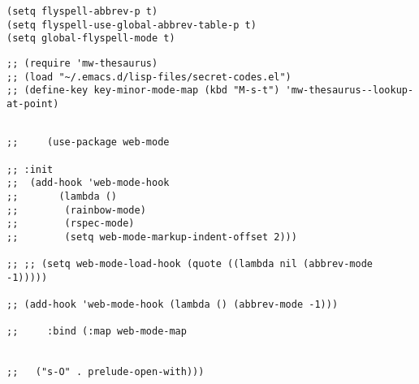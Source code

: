 \documentclass[11pt]{article}
\begin{document}
\label{sec:orgbe33d24}
\begin{verbatim}
(setq flyspell-abbrev-p t)
(setq flyspell-use-global-abbrev-table-p t)
(setq global-flyspell-mode t)
\end{verbatim}

\label{sec:org73724bb}
\begin{verbatim}
;; (require 'mw-thesaurus)
;; (load "~/.emacs.d/lisp-files/secret-codes.el")
;; (define-key key-minor-mode-map (kbd "M-s-t") 'mw-thesaurus--lookup-at-point)
\end{verbatim}

\label{sec:orgd09a244}
\begin{verbatim}

;;     (use-package web-mode

;; :init
;;  (add-hook 'web-mode-hook
;;       (lambda ()
;;        (rainbow-mode)
;;        (rspec-mode)
;;        (setq web-mode-markup-indent-offset 2)))

;; ;; (setq web-mode-load-hook (quote ((lambda nil (abbrev-mode -1)))))

;; (add-hook 'web-mode-hook (lambda () (abbrev-mode -1)))

;;     :bind (:map web-mode-map 


;;   ("s-O" . prelude-open-with)))
\end{verbatim}
\label{sec:org6e7a6ce}
\end{document}
